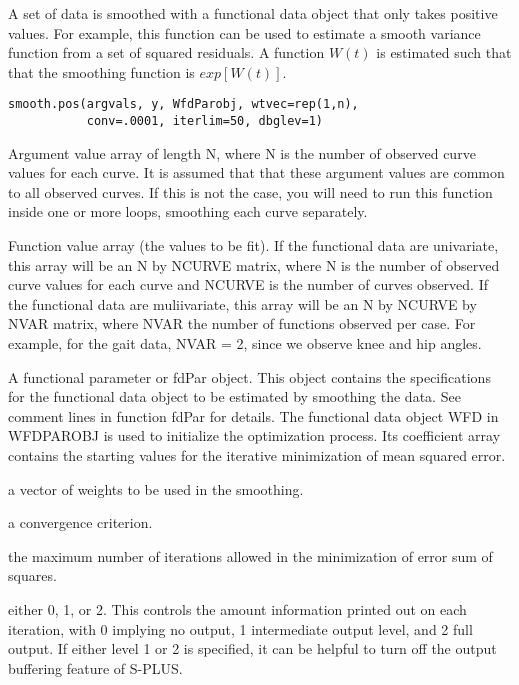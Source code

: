 \begin{Description}\relax
A set of data is smoothed with a functional data object that only
takes positive values.  For example, this function can be used to
estimate a smooth variance function from a set of squared residuals.
A function $W(t)$ is estimated such that that the smoothing function
is $exp[W(t)]$.
\end{Description}
\begin{Usage}
\begin{verbatim}
smooth.pos(argvals, y, WfdParobj, wtvec=rep(1,n),
           conv=.0001, iterlim=50, dbglev=1)
\end{verbatim}
\end{Usage}
\begin{Arguments}
\begin{ldescription}
\item[\code{argvals}] Argument value array of length N, where N is the number of observed
curve values for each curve.  It is assumed that that these argument
values are common to all observed curves.  If this is not the case,
you will need to run this function inside one or more loops,
smoothing each curve separately.

\item[\code{y}] Function value array (the values to be fit).  If the functional data
are univariate, this array will be an N by NCURVE matrix, where N is
the number of observed curve values for each curve and NCURVE is the
number of curves observed.  If the functional data are muliivariate,
this array will be an N by NCURVE by NVAR matrix, where NVAR the
number of functions observed per case.  For example, for the gait
data, NVAR = 2, since we observe knee and hip angles.

\item[\code{WfdParobj}] A functional parameter or fdPar object.  This object contains the
specifications for the functional data object to be estimated by
smoothing the data.  See comment lines in function fdPar for
details.  The functional data object WFD in WFDPAROBJ is used to
initialize the optimization process.  Its coefficient array contains
the starting values for the iterative minimization of mean squared
error.

\item[\code{wtvec}] a vector of weights to be used in the smoothing.

\item[\code{conv}] a convergence criterion.

\item[\code{iterlim}] the maximum number of iterations allowed in the minimization of
error sum of squares.

\item[\code{dbglev}] either 0, 1, or 2.  This controls the amount information printed out
on each iteration, with 0 implying no output, 1 intermediate output
level, and 2 full output.  If either level 1 or 2 is specified, it
can be helpful to turn off the output buffering feature of S-PLUS.

\end{ldescription}
\end{Arguments}

